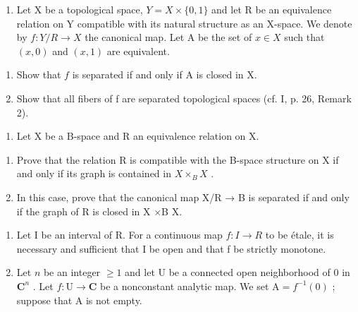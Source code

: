 \exercisegroup

\begin{enumerate}
\def\labelenumi{\arabic{enumi})}
\tightlist
\item
  Let X be a topological space, \(Y = X \times \{0, 1\}\) and let R be an equivalence relation on Y compatible with its natural structure as an X-space. We denote by \(f: Y/R \to X\) the canonical map. Let A be the set of \(x \in X\) such that \((x, 0)\) and \((x, 1)\) are equivalent.
\end{enumerate}

\begin{enumerate}
\def\labelenumi{\alph{enumi})}
\item
  Show that \(f\) is separated if and only if A is closed in X.
\item
  Show that all fibers of f are separated topological spaces (cf. I, p. 26, Remark 2).
\end{enumerate}

\begin{enumerate}
\def\labelenumi{\arabic{enumi})}
\setcounter{enumi}{1}
\tightlist
\item
  Let X be a B-space and R an equivalence relation on X.
\end{enumerate}

\begin{enumerate}
\def\labelenumi{\alph{enumi})}
\item
  Prove that the relation R is compatible with the B-space structure on X if and only if its graph is contained in \(X \times_{B} X\) .
\item
  In this case, prove that the canonical map X/R → B is separated if and only if the graph of R is closed in X ×B X.
\end{enumerate}

\begin{enumerate}
\def\labelenumi{\arabic{enumi})}
\setcounter{enumi}{2}
\item
  Let I be an interval of R. For a continuous map \(f: I \rightarrow R\) to be étale, it is necessary and sufficient that I be open and that f be strictly monotone.
\item
  Let \(n\) be an integer \(\geqslant 1\) and let U be a connected open neighborhood of 0 in \(\mathbf{C}^n\) . Let \(f: \mathrm{U} \to \mathbf{C}\) be a nonconstant analytic map. We set \(\mathrm{A} = f^{-1}(0)\) ; suppose that A is not empty.
\end{enumerate}

